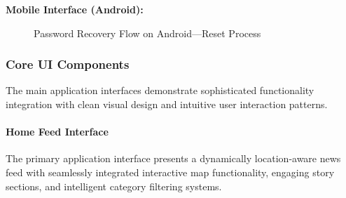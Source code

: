 \textbf{Mobile Interface (Android):}
\begin{figure}[!htbp]
    \centering
    \hspace{0.02\textwidth}
    \caption{Password Recovery Flow on Android---Reset Process}\label{fig:android_password_recovery}
\end{figure}

\subsubsection{Core UI Components}\label{subsubsec:core_ui_components}

The main application interfaces demonstrate sophisticated functionality integration with clean visual design and intuitive user interaction patterns.

\paragraph{Home Feed Interface}
The primary application interface presents a dynamically location-aware news feed with seamlessly integrated interactive map functionality, engaging story sections, and intelligent category filtering systems.

